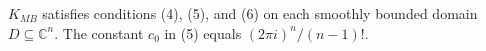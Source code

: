 
$K_{MB}$ satisfies conditions (4), (5), and (6) on each smoothly bounded domain $D \subseteq \mathbb{C}^n$. The constant $c_0$ in (5) equals $(2\pi i)^n / (n-1)!$.
